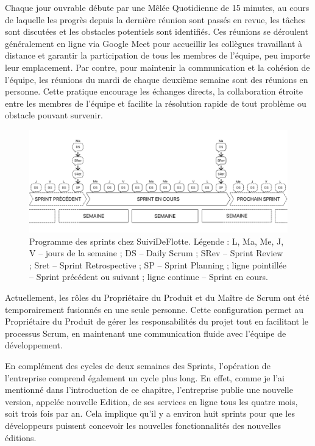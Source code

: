 Chaque jour ouvrable débute par une Mêlée Quotidienne de 15 minutes, au cours de laquelle les progrès depuis la dernière réunion sont passés en revue, les tâches sont discutées et les obstacles potentiels sont identifiés. Ces réunions se déroulent généralement en ligne via Google Meet pour accueillir les collègues travaillant à distance et garantir la participation de tous les membres de l'équipe, peu importe leur emplacement. Par contre, pour maintenir la communication et la cohésion de l'équipe, les réunions du mardi de chaque deuxième semaine sont des réunions en personne. Cette pratique encourage les échanges directs, la collaboration étroite entre les membres de l'équipe et facilite la résolution rapide de tout problème ou obstacle pouvant survenir.

\begin{figure}[ht]
    \centering
    \includegraphics[width=\textwidth]{img/sprint04}
    \caption{Programme des sprints chez SuiviDeFlotte. Légende : L, Ma, Me, J, V -- jours de la semaine ; DS -- Daily Scrum ; SRev -- Sprint Review ; Sret -- Sprint Retrospective ; SP -- Sprint Planning ; ligne pointillée -- Sprint précédent ou suivant ; ligne continue -- Sprint en cours.}
    \label{fig:sprint}
\end{figure}

Actuellement, les rôles du Propriétaire du Produit et du Maître de Scrum ont été temporairement fusionnés en une seule personne. Cette configuration permet au Propriétaire du Produit de gérer les responsabilités du projet tout en facilitant le processus Scrum, en maintenant une communication fluide avec l'équipe de développement.

En complément des cycles de deux semaines des Sprints, l'opération de l'entreprise comprend également un cycle plus long. En effet, comme je l'ai mentionné dans l'introduction de ce chapitre, l'entreprise publie une nouvelle version, appelée nouvelle Edition, de ses services en ligne tous les quatre mois, soit trois fois par an. Cela implique qu'il y a environ huit sprints pour que les développeurs puissent concevoir les nouvelles fonctionnalités des nouvelles éditions.

